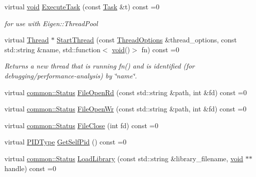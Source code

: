 \begin{DoxyCompactItemize}
virtual \mbox{\hyperlink{mlasi_8h_a88f941d423cb2a819b70a1358982b1a6}{void}} \mbox{\hyperlink{classonnxruntime_1_1Env_a1270e73cbc0c76b8fc17c71623c065ec}{Execute\+Task}} (const \mbox{\hyperlink{structonnxruntime_1_1Env_1_1Task}{Task}} \&t) const =0
\begin{DoxyCompactList}\small\item\em for use with Eigen\+::\+Thread\+Pool \end{DoxyCompactList}\item 
virtual \mbox{\hyperlink{classonnxruntime_1_1Thread}{Thread}} $\ast$ \mbox{\hyperlink{classonnxruntime_1_1Env_a3c31e79c5ef19deafbaa10142aa4610e}{Start\+Thread}} (const \mbox{\hyperlink{structonnxruntime_1_1ThreadOptions}{Thread\+Options}} \&thread\+\_\+options, const std\+::string \&name, std\+::function$<$ \mbox{\hyperlink{mlasi_8h_a88f941d423cb2a819b70a1358982b1a6}{void}}()$>$ fn) const =0
\begin{DoxyCompactList}\small\item\em Returns a new thread that is running fn() and is identified (for debugging/performance-\/analysis) by \char`\"{}name\char`\"{}. \end{DoxyCompactList}\item 
virtual \mbox{\hyperlink{classonnxruntime_1_1common_1_1Status}{common\+::\+Status}} \mbox{\hyperlink{classonnxruntime_1_1Env_aa0c0ce6e07920d1acd1794cff15d0577}{File\+Open\+Rd}} (const std\+::string \&path, int \&fd) const =0
\item 
virtual \mbox{\hyperlink{classonnxruntime_1_1common_1_1Status}{common\+::\+Status}} \mbox{\hyperlink{classonnxruntime_1_1Env_a3a4b5c4983f2fe3f8fad18dcc8c44f1f}{File\+Open\+Wr}} (const std\+::string \&path, int \&fd) const =0
\item 
virtual \mbox{\hyperlink{classonnxruntime_1_1common_1_1Status}{common\+::\+Status}} \mbox{\hyperlink{classonnxruntime_1_1Env_aba47acf27bb87a6e5710e45b20e0fc4c}{File\+Close}} (int fd) const =0
\item 
virtual \mbox{\hyperlink{namespaceonnxruntime_ab899e71c070d3fe82ae09bb53075b258}{P\+I\+D\+Type}} \mbox{\hyperlink{classonnxruntime_1_1Env_a1b78c553e28b5d996655d81bb447c84d}{Get\+Self\+Pid}} () const =0
\item 
virtual \mbox{\hyperlink{classonnxruntime_1_1common_1_1Status}{common\+::\+Status}} \mbox{\hyperlink{classonnxruntime_1_1Env_acb9c20a7aca7ff9f33088d18a95cc81b}{Load\+Library}} (const std\+::string \&library\+\_\+filename, \mbox{\hyperlink{mlasi_8h_a88f941d423cb2a819b70a1358982b1a6}{void}} $\ast$$\ast$handle) const =0
$$
\end{DoxyCompactItemize}
